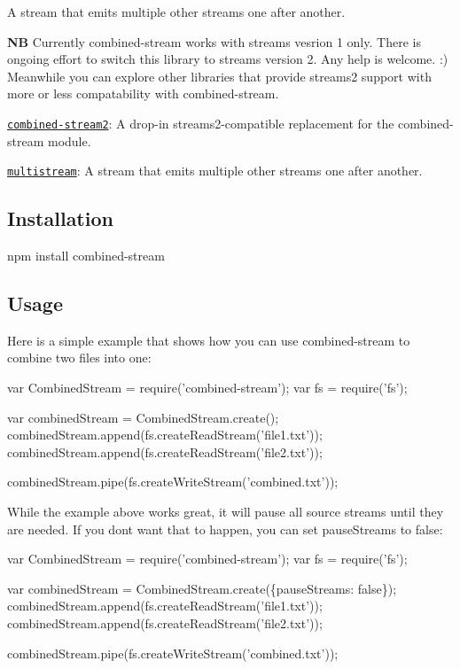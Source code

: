 A stream that emits multiple other streams one after another.

{\bfseries NB} Currently {\ttfamily combined-\/stream} works with streams vesrion 1 only. There is ongoing effort to switch this library to streams version 2. Any help is welcome. \+:) Meanwhile you can explore other libraries that provide streams2 support with more or less compatability with {\ttfamily combined-\/stream}.


\begin{DoxyItemize}
\item \href{https://www.npmjs.com/package/combined-stream2}{\tt combined-\/stream2}\+: A drop-\/in streams2-\/compatible replacement for the combined-\/stream module.
\item \href{https://www.npmjs.com/package/multistream}{\tt multistream}\+: A stream that emits multiple other streams one after another.
\end{DoxyItemize}

\subsection*{Installation}


\begin{DoxyCode}
npm install combined-stream
\end{DoxyCode}


\subsection*{Usage}

Here is a simple example that shows how you can use combined-\/stream to combine two files into one\+:


\begin{DoxyCode}
var CombinedStream = require('combined-stream');
var fs = require('fs');

var combinedStream = CombinedStream.create();
combinedStream.append(fs.createReadStream('file1.txt'));
combinedStream.append(fs.createReadStream('file2.txt'));

combinedStream.pipe(fs.createWriteStream('combined.txt'));
\end{DoxyCode}


While the example above works great, it will pause all source streams until they are needed. If you don\textquotesingle{}t want that to happen, you can set {\ttfamily pause\+Streams} to {\ttfamily false}\+:


\begin{DoxyCode}
var CombinedStream = require('combined-stream');
var fs = require('fs');

var combinedStream = CombinedStream.create(\{pauseStreams: false\});
combinedStream.append(fs.createReadStream('file1.txt'));
combinedStream.append(fs.createReadStream('file2.txt'));

combinedStream.pipe(fs.createWriteStream('combined.txt'));
\end{DoxyCode}


